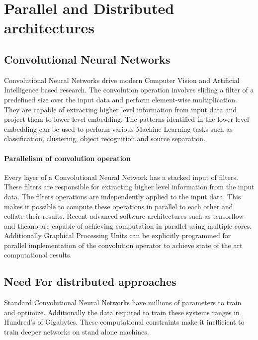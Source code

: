 \documentclass[sigconf]{acmart}
\begin{document}
\section{Parallel and Distributed architectures} \label{parallel}

\subsection{Convolutional Neural Networks}

Convolutional Neural Networks drive modern Computer Vision and Artificial Intelligence based research. The convolution operation involves sliding a filter of a predefined size over the input data and perform element-wise multiplication. They are capable of extracting higher level information from input data and project them to lower level embedding. The patterns identified in the lower level embedding can be used to perform various Machine Learning tasks such as classification, clustering, object recognition and source separation.


\paragraph{\textbf{Parallelism of convolution operation}}

Every layer of a Convolutional Neural Network has a stacked input of filters. These filters are responsible for extracting higher level information from the input data. The filters operations are independently applied to the input data. This makes it possible to compute these operations in parallel to each other and collate their results\cite{NIPS2012-4824}. Recent advanced software architectures such as tensorflow and theano are capable of achieving computation in parallel using multiple cores. Additionally Graphical Processing Units can be explicitly programmed for parallel implementation of the convolution operator to achieve state of the art computational results.

\subsection{Need For distributed approaches}

Standard Convolutional Neural Networks have millions of parameters to train and optimize. Additionally the data required to train these systems ranges in Hundred's of Gigabytes. These computational constraints make it inefficient to train deeper networks on stand alone machines.
\end{document}
